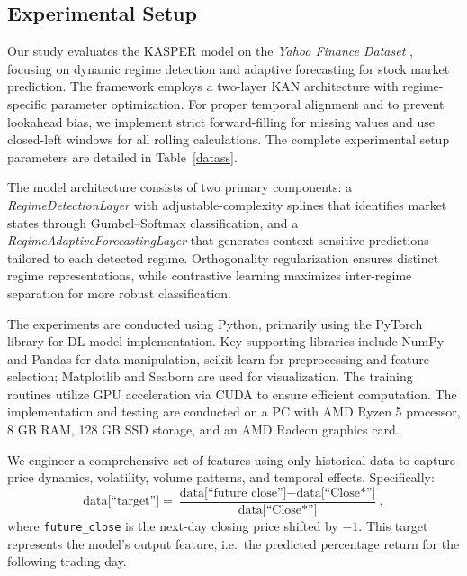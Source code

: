 \documentclass[conference,10pt]{IEEEtran}
\begin{document}
\subsection{Experimental Setup}

Our study evaluates the KASPER model on the \textit{Yahoo Finance Dataset} \cite{dataset}, focusing on dynamic regime detection and adaptive forecasting for stock market prediction. The framework employs a two-layer KAN architecture with regime-specific parameter optimization. For proper temporal alignment and to prevent lookahead bias, we implement strict forward-filling for missing values and use closed-left windows for all rolling calculations. The complete experimental setup parameters are detailed in Table~\ref{datass}.

The model architecture consists of two primary components: a \textit{RegimeDetectionLayer} with adjustable-complexity splines that identifies market states through Gumbel–Softmax classification, and a \textit{RegimeAdaptiveForecastingLayer} that generates context-sensitive predictions tailored to each detected regime. Orthogonality regularization ensures distinct regime representations, while contrastive learning maximizes inter-regime separation for more robust classification.

The experiments are conducted using Python, primarily using the PyTorch library for DL model implementation. Key supporting libraries include NumPy and Pandas for data manipulation, scikit-learn for preprocessing and feature selection; Matplotlib and Seaborn are used for visualization. The training routines utilize GPU acceleration via CUDA to ensure efficient computation. The implementation and testing are conducted on a PC with AMD Ryzen 5 processor, 8 GB RAM, 128 GB SSD storage, and an AMD Radeon graphics card.

\medskip

We engineer a comprehensive set of features using only historical data to capture price dynamics, volatility, volume patterns, and temporal effects. Specifically:
\[
\text{data[``target'']} = \frac{\text{data[``future\_close'']} - \text{data[``Close*'']}}{\text{data[``Close*'']}},
\]
where \texttt{future\_close} is the next-day closing price shifted by \(-1\). This target represents the model's output feature, i.e.\ the predicted percentage return for the following trading day.
\end{document}
